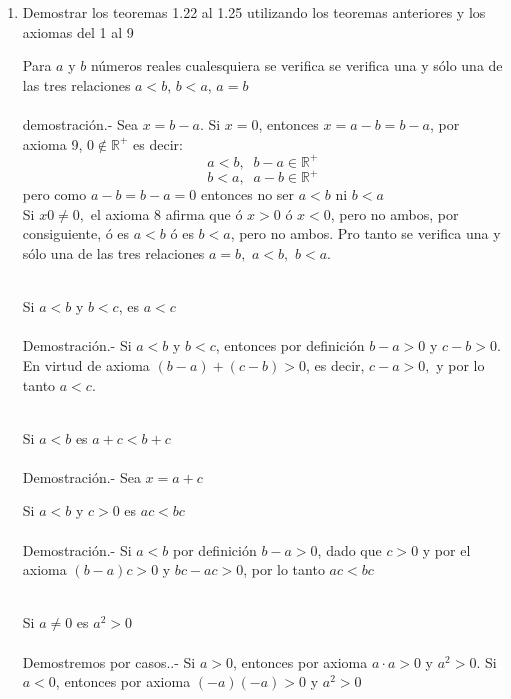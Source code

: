 \begin{enumerate}[\bfseries  1.]
\item Demostrar los teoremas 1.22 al 1.25 utilizando los teoremas anteriores y los axiomas del 1 al 9
\begin{teo}
Para $a$ y $b$ números reales cualesquiera se verifica se verifica una y sólo una de las tres relaciones $a<b$, $b<a$, $a=b$\\\\
demostración.- \;
Sea $x=b-a$. Si $x=0$, entonces $x=a-b=b-a$, por axioma 9, $0\notin \mathbb{R}^+$ es decir:
$$a<b, \; \; b-a \in \mathbb{R}^+$$
$$b<a, \; \;  a-b \in \mathbb{R}^+$$
pero como $a-b=b-a=0$ entonces no ser $a<b$ ni $b<a$\\
Si $x0\neq 0,$ el axioma 8 afirma que ó $x>0$ ó $ x<0$, pero no ambos, por consiguiente, ó es $a<b$ ó es $b<a$, pero no ambos. Pro tanto se verifica una y sólo una de las tres relaciones $a=b,$ $a<b,$ $b<a$.\\\\
\end{teo}

\begin{teo}
Si $a<b$ y $b<c$, es $a<c$\\\\
Demostración.- \;
Si $a<b$ y $b<c$, entonces por definición $b-a>0$ y $c-b>0$. En virtud de axioma  $(b-a)+(c-b)>0$, es decir, $c-a>0,$ y por lo tanto $a<c$.\\\\
\end{teo}

\begin{teo}
Si $a<b$ es $a+c<b+c$\\\\
Demostración.- \;
Sea $x=a+c$
\end{teo}

\begin{teo}
Si $a<b$ y $c>0$ es $ac<bc$\\\\
Demostración.- \;
Si $a<b$ por definición $b-a>0$, dado que  $c>0$ y por el axioma  $(b-a)c>0$ y $bc-ac>0$, por lo tanto $ac<bc$\\\\
\end{teo}

\begin{teo}
Si $a\neq0$ es $a^2>0$\\\\
Demostremos por casos..- \;
Si $a>0$, entonces por axioma   \; $a\cdot a >0$ \; y \; $a^2>0$. Si $a<0$, entonces por axioma   \; $(-a)(-a)>0$ \; y  \; $a^2>0$\\\\
\end{teo}


\end{enumerate}
